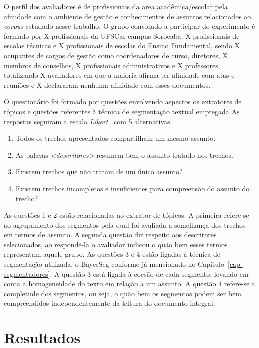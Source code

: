 O perfil dos avaliadores é de profissionais da area acadêmica/escolar pela afinidade com o ambiente de gestão e conhecimentos de assuntos relacionados ao \textit{corpus} estudado nesse trabalho. O grupo convidado a participar do experimento é formado por X profissionais da UFSCar campus Sorocaba, X profissionais de escolas técnicas e X profissionais de escolas do Ensino Fundamental, sendo X ocupantes de cargos de gestão como coordenadores de curso, diretores, X membros de conselhos, X profissionais administrativos e X professores, totalizando X avaliadores em que a maioria afirma ter afinidade com atas e reuniões e X declararam nenhuma afinidade com esses documentos.


O questionário foi formado por questões envolvendo aspectos os extratores de tópicos e questões referentes à técnica de segmentação textual empregada
As respostas seguiram a escala \textit{Likert}~\cite{Norman2010} com 5 alternativas. 

\begin{enumerate}
	\item Todos os trechos apresentados compartilham um mesmo assunto.
	\item As palavas \textit{<descritores>} resumem bem o assunto tratado nos trechos.
	\item Existem trechos que não tratam de um único assunto?
	\item Existem trechos incompletos e insuficientes para compreensão do assunto do trecho?
\end{enumerate}


As questões 1 e 2 estão relacionadas ao extrator de tópicos. A primeira refere-se ao agrupamento dos segmentos pela qual foi avaliada a semelhança dos trechos em termos de assunto. A segunda questão diz respeito aos descritores selecionados, ao respondê-la o avaliador indicou o quão bem esses termos representam aquele grupo.
As questões 3 e 4 estão ligadas à técnica de segmentação utilizada, o BayesSeg conforme já mencionado no Capítulo~\ref{cap-segmentadores}. A questão 3 está ligada à coesão de cada segmento, levando em conta a homogeneidade do texto em relação a um assunto. A questão 4 refere-se a completude dos segmentos, ou seja, o quão bem os segmentos podem ser bem compreendidos independentemente da leitura do documento integral.









\section{Resultados}


